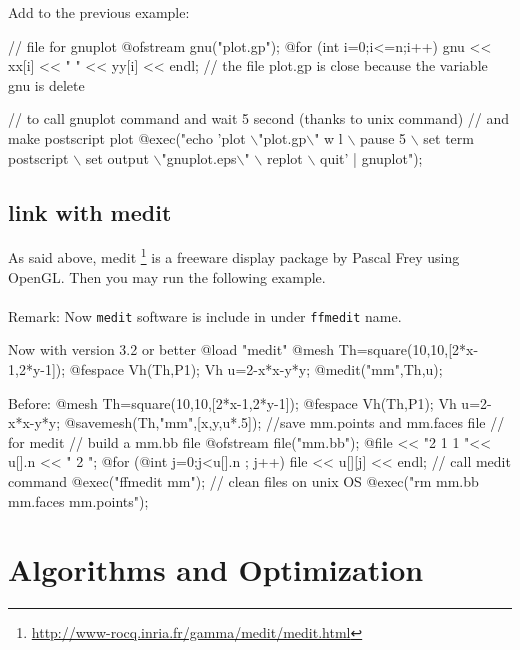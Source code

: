 \documentclass[a4paper,twoside,12pt]{book}
\def\n{\nabla}
\begin{document}
Add to the previous example:
{\def\bks{$\backslash$}
\bFF
{                          // file for gnuplot
  @ofstream gnu("plot.gp");
  @for (int i=0;i<=n;i++)
   {
     gnu <<  xx[i] << " " << yy[i] << endl;
    }
} //  the file plot.gp is close because the variable gnu is delete

//  to call gnuplot command and wait 5 second (thanks to unix command)
//  and make postscript plot
@exec("echo 'plot \bks"plot.gp\bks" w l \bks
pause 5 \bks
set term postscript \bks
set output \bks"gnuplot.eps\bks" \bks
replot \bks
quit' | gnuplot");
\eFF}

\subsection{link with medit}\label{sec:medit}
As said above, medit \footnote{\url{http://www-rocq.inria.fr/gamma/medit/medit.html}} is a
freeware display package by Pascal Frey using OpenGL. Then you may run the following example.
\\\\
Remark: Now \texttt{medit} software is include in \freefempp under \texttt{ffmedit} name.  

Now with version 3.2 or better
\bFF
@load "medit"
@mesh Th=square(10,10,[2*x-1,2*y-1]);
@fespace Vh(Th,P1);
Vh u=2-x*x-y*y;
@medit("mm",Th,u);
\eFF

Before:
\bFF
@mesh Th=square(10,10,[2*x-1,2*y-1]);
@fespace Vh(Th,P1);
Vh u=2-x*x-y*y;
   @savemesh(Th,"mm",[x,y,u*.5]); //save mm.points and mm.faces file
// for medit
   // build a mm.bb file
  { 
   @ofstream file("mm.bb");
   @file << "2 1 1 "<< u[].n << " 2 \n";
   @for (@int j=0;j<u[].n ; j++)
     file << u[][j] << endl;
  }
    // call medit command
    @exec("ffmedit mm");
    // clean files on unix OS
    @exec("rm mm.bb      mm.faces   mm.points");
\eFF





\section{Algorithms and Optimization}
\end{document}
